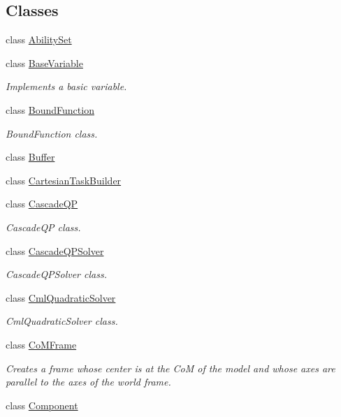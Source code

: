 \subsection*{Classes}
\begin{DoxyCompactItemize}
\item 
class \hyperlink{classocra_1_1AbilitySet}{Ability\+Set}
\item 
class \hyperlink{classocra_1_1BaseVariable}{Base\+Variable}
\begin{DoxyCompactList}\small\item\em Implements a basic variable. \end{DoxyCompactList}\item 
class \hyperlink{classocra_1_1BoundFunction}{Bound\+Function}
\begin{DoxyCompactList}\small\item\em Bound\+Function class. \end{DoxyCompactList}\item 
class \hyperlink{classocra_1_1Buffer}{Buffer}
\item 
class \hyperlink{classocra_1_1CartesianTaskBuilder}{Cartesian\+Task\+Builder}
\item 
class \hyperlink{classocra_1_1CascadeQP}{Cascade\+QP}
\begin{DoxyCompactList}\small\item\em Cascade\+QP class. \end{DoxyCompactList}\item 
class \hyperlink{classocra_1_1CascadeQPSolver}{Cascade\+Q\+P\+Solver}
\begin{DoxyCompactList}\small\item\em Cascade\+Q\+P\+Solver class. \end{DoxyCompactList}\item 
class \hyperlink{classocra_1_1CmlQuadraticSolver}{Cml\+Quadratic\+Solver}
\begin{DoxyCompactList}\small\item\em Cml\+Quadratic\+Solver class. \end{DoxyCompactList}\item 
class \hyperlink{classocra_1_1CoMFrame}{Co\+M\+Frame}
\begin{DoxyCompactList}\small\item\em Creates a frame whose center is at the CoM of the model and whose axes are parallel to the axes of the world frame. \end{DoxyCompactList}\item 
class \hyperlink{classocra_1_1Component}{Component}

\end{DoxyCompactItemize}
